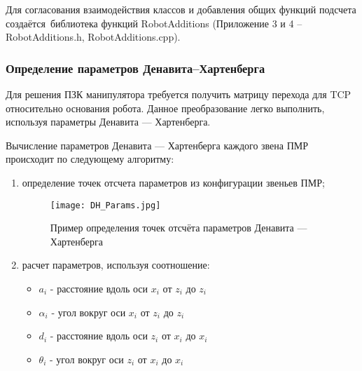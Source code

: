 Для согласования взаимодействия классов и добавления общих \hspace{0,1cm}функций \hspace{0,1cm}подсчета  \mbox{создаётся }библиотека функций RobotAdditions  (Приложение 3 и 4 \hspace{0,4cm}--\hspace{0,4cm} RobotAdditions.h, RobotAdditions.cpp).

\subsubsection{\textbf{Определение параметров Денавита–Хартенберга}}

Для решения ПЗК манипулятора требуется получить матрицу перехода для TCP относительно основания робота. Данное преобразование легко выполнить, используя параметры Денавита — Хартенберга.

Вычисление параметров Денавита — Хартенберга каждого звена ПМР происходит по следующему алгоритму:

\begin{enumerate} [label = \arabic*)]
    \item определение точек отсчета параметров из конфигурации звеньев ПМР;
        \begin{gostfigure} %
    \begin{figure}[h] %
        \centering %
        \texttt{[image: DH\_Params.jpg]} %
        \caption{Пример определения точек отсчёта параметров Денавита — Хартенберга} %
    \end{figure}
\end{gostfigure}
    \item расчет параметров, используя соотношение:
    \begin{itemize}
        \item $a_i$ - расстояние вдоль оси $x_i$ от $z_i$ до $z_i$
        \item $\alpha_i$ - угол вокруг оси $x_i$ от $z_i$ до $z_i$
        \item $d_i$ - расстояние вдоль оси $z_i$ от $x_i$ до $x_i$
        \item $\theta_i$ - угол вокруг оси $z_i$ от $x_i$ до $x_i$
\end{itemize}

\end{enumerate}

\newpage

